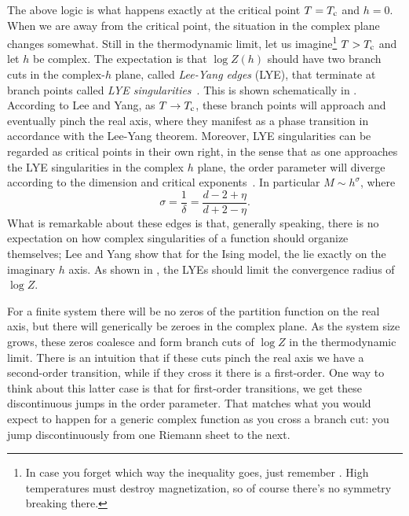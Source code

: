 The above logic is what happens exactly at the critical point $T=T_{\rm c}$ and $h=0$.
When we are away from the critical point, the situation in the complex plane
changes somewhat. Still in the thermodynamic limit, let us 
imagine\footnote{In case you forget which way the inequality goes, just
remember . High temperatures must destroy
magnetization, so of course there's no symmetry breaking there.} $T>T_{\rm c}$ 
and let $h$ be complex. The expectation is that $\log Z(h)$ should
have two branch cuts in the complex-$h$ plane, called 
{\it Lee-Yang edges} (LYE), that terminate at
branch points called {\it LYE singularities}~\cite{lee_statistical_1952}.
This is shown schematically in . According to Lee and Yang, 
as $T\to T_{\rm c}$, these branch points will approach and eventually
pinch the real axis, where they manifest as a phase transition
in accordance with the Lee-Yang theorem.
Moreover, LYE singularities can be regarded as critical points in their
own right, in the sense that as one approaches the LYE singularities 
in the complex $h$ plane, the order parameter will diverge
according to the dimension and critical 
exponents~\cite{fisher_yang-lee_1978}. In particular $M\sim h^\sigma$, where
\begin{equation}
\sigma=\frac{1}{\delta}=\frac{d-2+\eta}{d+2-\eta}.
\end{equation}
What is remarkable about these edges is that, generally speaking,
there is no expectation on how complex singularities of a function
should organize themselves; Lee and Yang show that for the Ising model,
the lie exactly on the imaginary $h$ axis.
As shown in , the LYEs should limit the convergence
radius of $\log Z$. 

For a finite system there will be no zeros of the partition function
on the real axis, but there will generically be zeroes in the complex
plane. As the system size grows, these zeros coalesce and form
branch cuts of $\log Z$ in the thermodynamic limit.
There is an intuition that if these cuts pinch the real axis we have a
second-order transition, while if they cross it there is a first-order.
One way to think about this latter case is that for first-order transitions, we
get these discontinuous jumps in the order parameter. That matches what you
would expect to happen for a generic complex function as you cross a branch cut:
you jump discontinuously from one Riemann sheet to the next.

